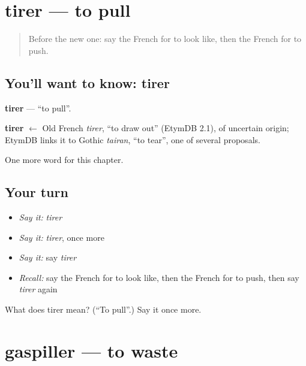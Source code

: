 \section[tirer]{tirer — to pull}

\label{lesson:FR-C181-tirer}



\begin{quote}
Before the new one: say the French for to look like, then the French for to push.
\end{quote}

\subsection*{You'll want to know: tirer}
\textbf{tirer} — \textquotedblleft{}to pull\textquotedblright{}.

\begin{cousinweb}
\textbf{tirer} $\leftarrow$ Old French \emph{tirer}, \textquotedblleft{}to draw out\textquotedblright{} (EtymDB 2.1), of uncertain origin; EtymDB links it to Gothic \emph{tairan}, \textquotedblleft{}to tear\textquotedblright{}, one of several proposals.
\end{cousinweb}

\begin{grammarlens}[title={What you've built}]
One more word for this chapter.
\end{grammarlens}

\subsection*{Your turn}
\begin{itemize}
\raggedright
  \item \emph{Say it:} \emph{tirer}
  \item \emph{Say it:} \emph{tirer}, once more
  \item \emph{Say it:} say \emph{tirer}
  \item \emph{Recall:} say the French for to look like, then the French for to push, then say \emph{tirer} again
\end{itemize}

\begin{tcolorbox}[breakable,colback=teal!4,colframe=teal!35!black,title={Before you move on}]
What does tirer mean? (\textquotedblleft{}To pull\textquotedblright{}.) Say it once more.
\end{tcolorbox}
\section[gaspiller]{gaspiller — to waste}

